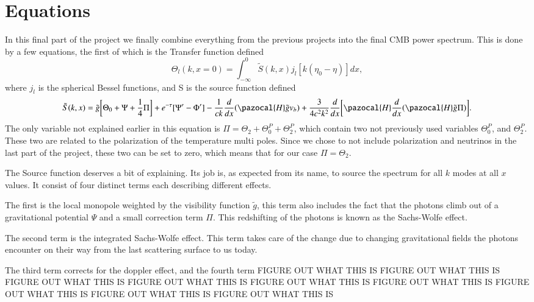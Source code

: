 \documentclass[a4paper]{report}
\begin{document}
\section{Equations}\label{sec:Equations}
In this final part of the project we finally combine everything from the previous projects into the final CMB power spectrum. This is done by a few equations, the first of which is the Transfer function defined
\begin{equation}
 \Theta_l(k,x=0)=\int^0_{-\infty} \tilde{S}(k,x)j_l[k(\eta_0-\eta)]dx,
\end{equation}
where $j_l$ is the spherical Bessel functions, and S is the source function defined
\begin{equation}
 \tilde{S}(k,x) = \tilde{g}\bigg[\Theta_0+\Psi+\frac{1}{4}\Pi\bigg]+e^{-\tau}[\Psi^\prime-\Phi^\prime]-\frac{1}{ck}\frac{d}{dx}(\pazocal{H}\tilde{g}v_b) +\frac{3}{4c^2k^2}\frac{d}{dx}\bigg[\pazocal{H}\frac{d}{dx}(\pazocal
{H}\tilde{g}\Pi) \bigg].
\end{equation}
The only variable not explained earlier in this equation is $\Pi = \Theta_2 +\Theta_0^P+\Theta_2^P$, which contain two not previously used variables $\Theta_0^P$, and $\Theta_2^P$. These two are related to the polarization of the temperature multi poles. Since we chose to not include polarization and neutrinos in the last part of the project, these two can be set to zero, which means that for our case $\Pi = \Theta_2$.

The Source function deserves a bit of explaining. Its job is, as expected from its name, to source the spectrum for all $k$ modes at all $x$ values. It consist of four distinct terms each describing different effects. 

The first is the local monopole weighted by the visibility function $\tilde{g}$, this term also includes the fact that the photons climb out of a gravitational potential $\Psi$ and a small correction term $\Pi$. This redshifting of the photons is known as the Sachs-Wolfe effect. 

The second term is the integrated Sachs-Wolfe effect. This term takes care of the change due to changing gravitational fields the photons encounter on their way from the last scattering surface to us today.

The third term corrects for the doppler effect, and the fourth term FIGURE OUT WHAT THIS IS FIGURE OUT WHAT THIS IS FIGURE OUT WHAT THIS IS FIGURE OUT WHAT THIS IS FIGURE OUT WHAT THIS IS FIGURE OUT WHAT THIS IS FIGURE OUT WHAT THIS IS FIGURE OUT WHAT THIS IS FIGURE OUT WHAT THIS IS 
\end{document}

